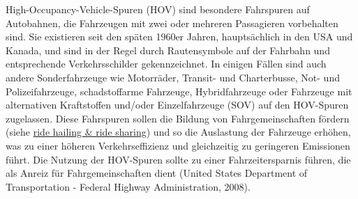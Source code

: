 \documentclass[
]{book}
\begin{document}
High-Occupancy-Vehicle-Spuren (HOV) sind besondere Fahrspuren auf Autobahnen, die Fahrzeugen mit zwei oder mehreren Passagieren vorbehalten sind. Sie existieren seit den späten 1960er Jahren, hauptsächlich in den USA und Kanada, und sind in der Regel durch Rautensymbole auf der Fahrbahn und entsprechende Verkehrsschilder gekennzeichnet. In einigen Fällen sind auch andere Sonderfahrzeuge wie Motorräder, Transit- und Charterbusse, Not- und Polizeifahrzeuge, schadstoffarme Fahrzeuge, Hybridfahrzeuge oder Fahrzeuge mit alternativen Kraftstoffen und/oder Einzelfahrzeuge (SOV) auf den HOV-Spuren zugelassen. Diese Fahrspuren sollen die Bildung von Fahrgemeinschaften fördern (siehe \protect\hyperlink{ride_hailing}{ride hailing \& ride sharing}) und so die Auslastung der Fahrzeuge erhöhen, was zu einer höheren Verkehrseffizienz und gleichzeitig zu geringeren Emissionen führt. Die Nutzung der HOV-Spuren sollte zu einer Fahrzeitersparnis führen, die als Anreiz für Fahrgemeinschaften dient (United States Department of Transportation - Federal Highway Administration, 2008).
\end{document}
